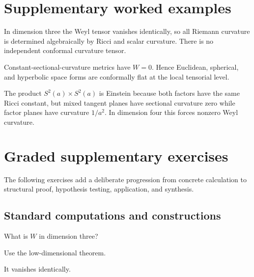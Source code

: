 \section{Supplementary worked examples}
\label{sec:vii28-pedagogy}

\begin{example}\label{ex:vii28-ped-01}
In dimension three the Weyl tensor vanishes identically, so all Riemann curvature is determined algebraically by Ricci and scalar curvature.  There is no independent conformal curvature tensor.
\end{example}

\begin{example}\label{ex:vii28-ped-02}
Constant-sectional-curvature metrics have \(W=0\).  Hence Euclidean, spherical, and hyperbolic space forms are conformally flat at the local tensorial level.
\end{example}

\begin{example}\label{ex:vii28-ped-03}
The product \(S^2(a)\times S^2(a)\) is Einstein because both factors have the same Ricci constant, but mixed tangent planes have sectional curvature zero while factor planes have curvature \(1/a^2\).  In dimension four this forces nonzero Weyl curvature.
\end{example}

\section{Graded supplementary exercises}
The following exercises add a deliberate progression from concrete calculation to structural proof, hypothesis testing, application, and synthesis.

\subsection*{Standard computations and constructions}

\begin{exercise}\label{exr:vii28-ped-01}
What is \(W\) in dimension three?
\end{exercise}

\begin{hint}
Use the low-dimensional theorem.
\end{hint}

\begin{solution}
It vanishes identically.
\end{solution}

